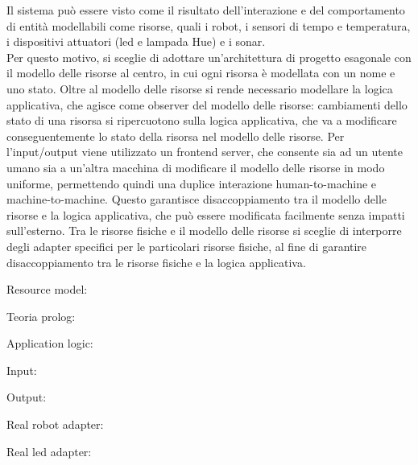 \documentclass{llncs}
\newcommand{\version}{7}
\begin{document}
Il sistema può essere visto come il risultato dell'interazione e del comportamento di entità modellabili come risorse, quali i robot, i sensori di tempo e temperatura, i dispositivi attuatori (led e lampada Hue) e i sonar. \\
Per questo motivo, si sceglie di adottare un'architettura di progetto esagonale con il modello delle risorse al centro, in cui ogni risorsa è modellata con un nome e uno stato.
Oltre al modello delle risorse si rende necessario modellare la logica applicativa, che agisce come observer del modello delle risorse: cambiamenti dello stato di una risorsa si ripercuotono sulla logica applicativa, che va a modificare conseguentemente lo stato della risorsa nel modello delle risorse.
Per l'input/output viene utilizzato un frontend server, che consente sia ad un utente umano sia a un'altra macchina di modificare il modello delle risorse in modo uniforme, permettendo quindi una duplice interazione human-to-machine e machine-to-machine.
Questo garantisce disaccoppiamento tra il modello delle risorse e la logica applicativa, che può essere modificata facilmente senza impatti sull'esterno.
Tra le risorse fisiche e il modello delle risorse si sceglie di interporre degli adapter specifici per le particolari risorse fisiche, al fine di garantire disaccoppiamento tra le risorse fisiche e la logica applicativa.

Resource model:

Teoria prolog:

Application logic:

Input:

Output:

Real robot adapter:

Real led adapter:

\end{document}
